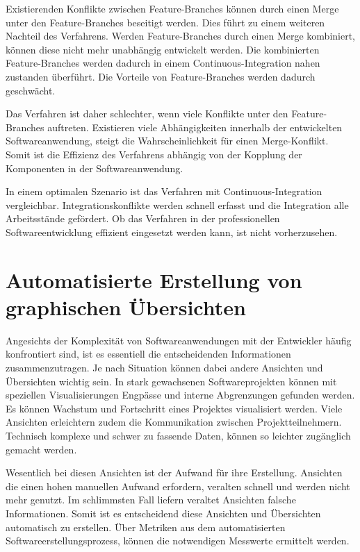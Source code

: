 Existierenden Konflikte zwischen Feature-Branches können durch einen Merge unter den Feature-Branches beseitigt werden. Dies führt zu einem weiteren Nachteil des Verfahrens. Werden Feature-Branches durch einen Merge kombiniert, können diese nicht mehr unabhängig entwickelt werden. Die kombinierten Feature-Branches werden dadurch in einem Continuous-Integration nahen zustanden überführt. Die Vorteile von Feature-Branches werden dadurch geschwächt.

Das Verfahren ist daher schlechter, wenn viele Konflikte unter den Feature-Branches auftreten. Existieren viele Abhängigkeiten innerhalb der entwickelten Softwareanwendung, steigt die Wahrscheinlichkeit für einen Merge-Konflikt. Somit ist die Effizienz des Verfahrens abhängig von der Kopplung der Komponenten in der Softwareanwendung.

In einem optimalen Szenario ist das Verfahren mit Continuous-Integration vergleichbar. Integrationskonflikte werden schnell erfasst und die Integration alle Arbeitsstände gefördert. Ob das Verfahren in der professionellen Softwareentwicklung effizient eingesetzt werden kann, ist nicht vorherzusehen.

\section{Automatisierte Erstellung von graphischen Übersichten}

Angesichts der Komplexität von Softwareanwendungen mit der Entwickler häufig konfrontiert sind, ist es essentiell die entscheidenden Informationen zusammenzutragen. Je nach Situation können dabei andere Ansichten und Übersichten wichtig sein. In stark gewachsenen Softwareprojekten können mit speziellen Visualisierungen Engpässe und interne Abgrenzungen gefunden werden. Es können Wachstum und Fortschritt eines Projektes visualisiert werden. Viele Ansichten erleichtern zudem die Kommunikation zwischen Projektteilnehmern. Technisch komplexe und schwer zu fassende Daten, können so leichter zugänglich gemacht werden.

Wesentlich bei diesen Ansichten ist der Aufwand für ihre Erstellung. Ansichten die einen hohen manuellen Aufwand erfordern, veralten schnell und werden nicht mehr genutzt. Im schlimmsten Fall liefern veraltet Ansichten falsche Informationen. Somit ist es entscheidend diese Ansichten und Übersichten automatisch zu erstellen. Über Metriken aus dem automatisierten Softwareerstellungsprozess, können die notwendigen Messwerte ermittelt werden. 

